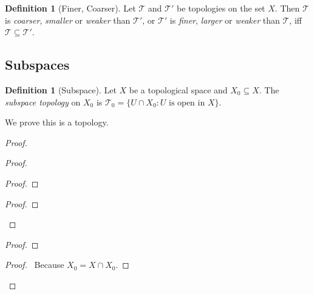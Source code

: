 \documentclass{book}
\let\qed\relax
\theoremstyle{definition}
\newtheorem{df}[ax]{Definition}
\begin{document}
\begin{df}[Finer, Coarser]
Let $\mathcal{T}$ and $\mathcal{T}'$ be topologies on the set $X$. Then $\mathcal{T}$ is \emph{coarser}, \emph{smaller} or \emph{weaker} than $\mathcal{T}'$, or $\mathcal{T}'$ is \emph{finer}, \emph{larger} or \emph{weaker} than $\mathcal{T}$, iff $\mathcal{T} \subseteq \mathcal{T}'$.
\end{df}

\subsection{Subspaces}

\begin{df}[Subspace]
Let $X$ be a topological space and $X_0 \subseteq X$. The \emph{subspace topology} on $X_0$ is $\mathcal{T}_0 = \{ U \cap X_0 : U \text{ is open in } X \}$.

We prove this is a topology.
\end{df}

\begin{proof}
\pf
{}
\begin{proof}
	\begin{proof}
	\end{proof}
	\begin{proof}
	\end{proof}
\end{proof}
\begin{proof}
\end{proof}
\begin{proof}
	\pf\ Because $X_0 = X \cap X_0$.
\end{proof}
\qed
\end{proof}
\end{document}
